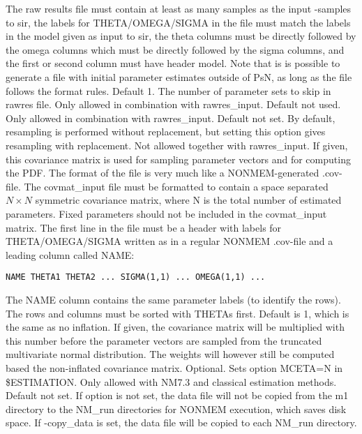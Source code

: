 \begin{optionlist}
The raw results file must contain at least as many 
samples as the input -samples to sir, the labels for  THETA/OMEGA/SIGMA 
in the file must match the labels in the model given as input 
to sir, the theta columns must be directly followed by the omega columns 
which must be directly followed by the sigma columns, and the first or
second column must have header model. Note that is is 
possible to generate a file with initial parameter estimates outside 
of PsN, as long as the file follows the format rules.
\nextopt
{}
Default 1. The number of parameter sets to skip in rawres file. Only allowed in combination with rawres\_input.
\nextopt
{}
Default not used. Only allowed in combination with rawres\_input.
\nextopt
{}
Default not set. By default, resampling is performed without replacement, but setting this option gives resampling with replacement.
\nextopt
{}
Not allowed together with rawres\_input. If given, this covariance matrix is
used for sampling parameter vectors and for computing the PDF. The format of the file is very much like a NONMEM-generated .cov-file. 
The covmat\_input file must be formatted to contain a space separated  $N\times N$ symmetric covariance matrix, 
where N is the total number of estimated parameters. Fixed parameters should not be included in the covmat\_input matrix. 
The first line in the file must be a header with labels for THETA/OMEGA/SIGMA written as in a regular NONMEM .cov-file 
and a leading column called NAME: 
\begin{verbatim}
NAME THETA1 THETA2 ... SIGMA(1,1) ... OMEGA(1,1) ... 
\end{verbatim}
The NAME column contains the same parameter labels (to identify the rows).
The rows and columns must be sorted with THETAs first.
\nextopt
{}
Default is 1, which is the same as no inflation. If given, the covariance
matrix will be multiplied with this number before the parameter vectors
are sampled from the truncated multivariate normal distribution.
The weights will however still be computed based the non-inflated covariance matrix. 
\nextopt
{}
Optional. Sets option MCETA=N in \$ESTIMATION. Only allowed with NM7.3 and classical estimation methods.
\nextopt
{}
Default not set. If option is not set, the data file will not be copied from the m1 directory to the NM\_run directories for NONMEM execution, which saves disk space. If -copy\_data is set, the data file will be copied to each NM\_run directory.
\nextopt
\end{optionlist}


